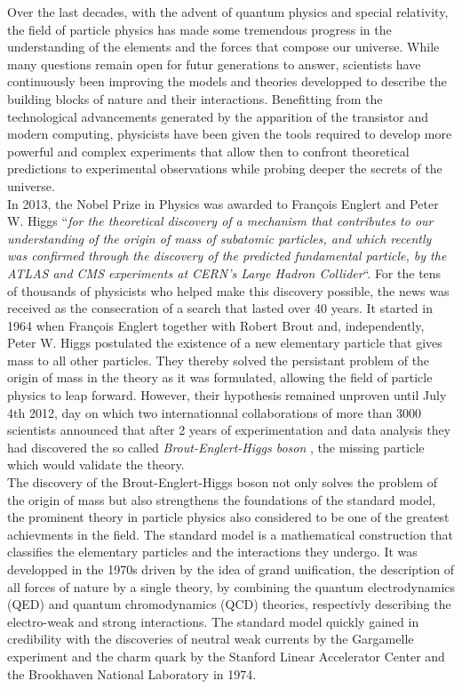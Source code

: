 Over the last decades, with the advent of quantum physics and special relativity, the field of particle physics has made some tremendous progress in the understanding of the elements and the forces that compose our universe. While many questions remain open for futur generations to answer, scientists have continuously been improving the models and theories developped to describe the building blocks of nature and their interactions. Benefitting from the technological advancements generated by the apparition of the transistor and modern computing, physicists have been given the tools required to develop more powerful and complex experiments that allow then to confront theoretical predictions to experimental observations while probing deeper the secrets of the universe. \\

In 2013, the Nobel Prize in Physics was awarded to Fran\c{c}ois Englert and Peter W. Higgs ``\textit{for the theoretical discovery of a mechanism that contributes to our understanding of the origin of mass of subatomic particles, and which recently was confirmed through the discovery of the predicted fundamental particle, by the ATLAS and CMS experiments at CERN's Large Hadron Collider}``. For the tens of thousands of physicists who helped make this discovery possible, the news was received as the consecration of a search that lasted over 40 years. It started in 1964 when Fran\c{c}ois Englert together with Robert Brout \cite{PhysRevLett.13.321} and, independently, Peter W. Higgs \cite{PhysRevLett.13.508} postulated the existence of a new elementary particle that gives mass to all other particles. They thereby solved the persistant problem of the origin of mass in the theory as it was formulated, allowing the field of particle physics to leap forward.  However, their hypothesis remained unproven until July 4th 2012, day on which two internationnal collaborations of more than 3000 scientists announced that after 2 years of experimentation and data analysis they had discovered the so called \textit{Brout-Englert-Higgs boson} \cite{PhysRevLett.114.191803}, the missing particle which would validate the theory. \\

The discovery of the Brout-Englert-Higgs boson not only solves the problem of the origin of mass but also strengthens the foundations of the standard model, the prominent theory in particle physics also considered to be one of the greatest achievments in the field. The standard model is a mathematical construction that classifies the elementary particles and the interactions they undergo. It was developped in the 1970s driven by the idea of grand unification, the description of all forces of nature by a single theory, by combining the quantum electrodynamics (QED) and quantum chromodynamics (QCD) theories, respectivly describing the electro-weak and strong interactions. The standard model quickly gained in credibility with the discoveries of neutral weak currents by the Gargamelle experiment and the charm quark by the Stanford Linear Accelerator Center and the Brookhaven National Laboratory in 1974. \\

